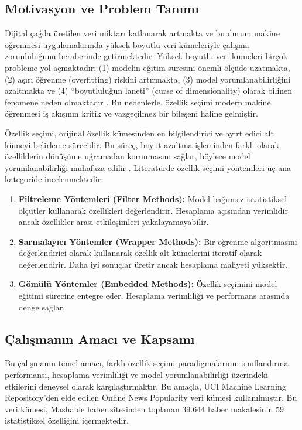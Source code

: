 \documentclass[conference]{IEEEtran}
\begin{document}
\subsection{Motivasyon ve Problem Tanımı}

Dijital çağda üretilen veri miktarı katlanarak artmakta ve bu durum makine öğrenmesi uygulamalarında yüksek boyutlu veri kümeleriyle çalışma zorunluluğunu beraberinde getirmektedir. Yüksek boyutlu veri kümeleri birçok probleme yol açmaktadır: (1) modelin eğitim süresini önemli ölçüde uzatmakta, (2) aşırı öğrenme (overfitting) riskini artırmakta, (3) model yorumlanabilirliğini azaltmakta ve (4) ``boyutluluğun laneti'' (curse of dimensionality) olarak bilinen fenomene neden olmaktadır \cite{guyon2003introduction}. Bu nedenlerle, özellik seçimi modern makine öğrenmesi iş akışının kritik ve vazgeçilmez bir bileşeni haline gelmiştir.

Özellik seçimi, orijinal özellik kümesinden en bilgilendirici ve ayırt edici alt kümeyi belirleme sürecidir. Bu süreç, boyut azaltma işleminden farklı olarak özelliklerin dönüşüme uğramadan korunmasını sağlar, böylece model yorumlanabilirliği muhafaza edilir \cite{chandrashekar2014survey}. Literatürde özellik seçimi yöntemleri üç ana kategoride incelenmektedir:

\begin{enumerate}
    \item \textbf{Filtreleme Yöntemleri (Filter Methods):} Model bağımsız istatistiksel ölçütler kullanarak özellikleri değerlendirir. Hesaplama açısından verimlidir ancak özellikler arası etkileşimleri yakalayamayabilir.
    
    \item \textbf{Sarmalayıcı Yöntemler (Wrapper Methods):} Bir öğrenme algoritmasını değerlendirici olarak kullanarak özellik alt kümelerini iteratif olarak değerlendirir. Daha iyi sonuçlar üretir ancak hesaplama maliyeti yüksektir.
    
    \item \textbf{Gömülü Yöntemler (Embedded Methods):} Özellik seçimini model eğitimi sürecine entegre eder. Hesaplama verimliliği ve performans arasında denge sağlar.
\end{enumerate}

\subsection{Çalışmanın Amacı ve Kapsamı}

Bu çalışmanın temel amacı, farklı özellik seçimi paradigmalarının sınıflandırma performansı, hesaplama verimliliği ve model yorumlanabilirliği üzerindeki etkilerini deneysel olarak karşılaştırmaktır. Bu amaçla, UCI Machine Learning Repository'den elde edilen Online News Popularity veri kümesi kullanılmıştır. Bu veri kümesi, Mashable haber sitesinden toplanan 39.644 haber makalesinin 59 istatistiksel özelliğini içermektedir.
\end{document}

